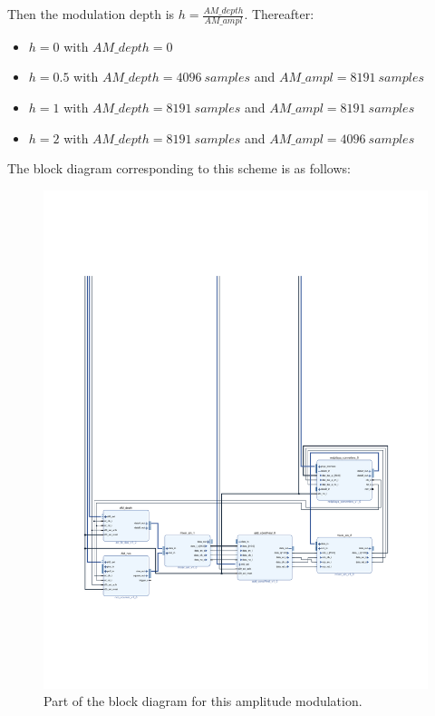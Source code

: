 \documentclass[12pt,oneside]{article}
\begin{document}
Then the modulation depth is $h=\frac{AM\_depth}{AM\_ampl}$. Thereafter:

\begin{itemize}
	\setlength\itemsep{-0.1cm}
	\item $h=0$ with $AM\_depth=0$ 
	\item $h=0.5$ with $AM\_depth=4096~samples$ and $AM\_ampl=8191~samples$
	\item $h=1$ with $AM\_depth=8191~samples$ and $AM\_ampl=8191~samples$
	\item $h=2$ with $AM\_depth=8191~samples$ and $AM\_ampl=4096~samples$
\end{itemize}

The block diagram corresponding to this scheme is as follows:

\begin{figure}[h!tb]
	\begin{center}
		\includegraphics[width=15cm,trim={2cm 5cm 2cm 14cm}, clip]{design/mod_ampl1.pdf}
		\caption{Part of the block diagram for this amplitude modulation.}
		\label{fig:mod_ampl1}
	\end{center}
\end{figure}
\end{document}
